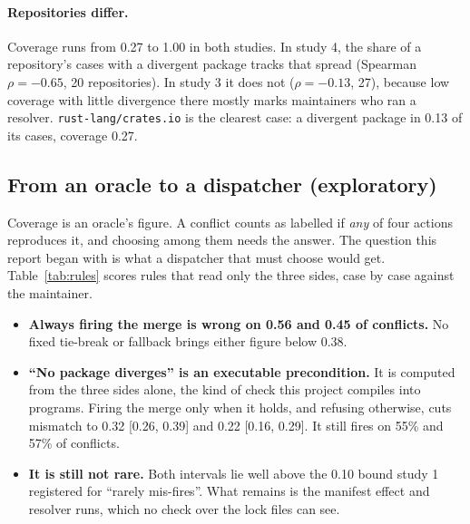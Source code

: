 \documentclass[11pt]{article}
\newcommand{\code}[1]{\texttt{#1}}
\begin{document}
\paragraph{Repositories differ.}
Coverage runs from 0.27 to 1.00 in both studies. In study 4, the share of a repository's cases
with a divergent package tracks that spread (Spearman $\rho=-0.65$, 20 repositories). In study 3
it does not ($\rho=-0.13$, 27), because low coverage with little divergence there mostly marks
maintainers who ran a resolver. \code{rust-lang/crates.io} is the clearest case: a divergent
package in 0.13 of its cases, coverage 0.27.

\subsection{From an oracle to a dispatcher (exploratory)}
\label{sec:dispatcher}

Coverage is an oracle's figure. A conflict counts as labelled if \emph{any} of four actions
reproduces it, and choosing among them needs the answer. The question this report began with is
what a dispatcher that must choose would get. Table~\ref{tab:rules} scores rules that read only
the three sides, case by case against the maintainer.

\begin{table}[t]
\centering
\caption{Rules that read only the three sides, scored case by case against the maintainer:
wrong fires over fires, and mismatch with its 95\% Wilson interval (exploratory). ``The merge''
is the predicted per-ecosystem merge.}
\label{tab:rules}
\small
\setlength{\tabcolsep}{3pt}
\resizebox{\linewidth}{!}{}
\end{table}

\begin{itemize}
  \item \textbf{Always firing the merge is wrong on 0.56 and 0.45 of conflicts.} No fixed
  tie-break or fallback brings either figure below 0.38.
  \item \textbf{``No package diverges'' is an executable precondition.} It is computed from the
  three sides alone, the kind of check this project compiles into programs. Firing the merge only
  when it holds, and refusing otherwise, cuts mismatch to 0.32 [0.26, 0.39] and 0.22 [0.16,
  0.29]. It still fires on 55\% and 57\% of conflicts.
  \item \textbf{It is still not rare.} Both intervals lie well above the 0.10 bound study 1
  registered for ``rarely mis-fires''. What remains is the manifest effect and resolver runs,
  which no check over the lock files can see.
\end{itemize}
\end{document}
